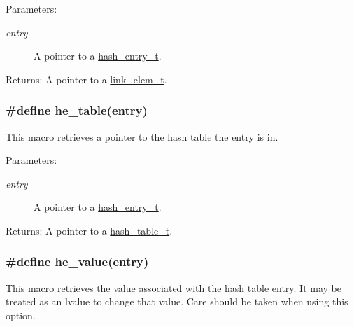 \begin{Desc}
\item[Parameters:]
\begin{description}
\item[{\em entry}]A pointer to a \hyperlink{group__dbprim__hash_a1}{hash\_\-entry\_\-t}.\end{description}
\end{Desc}
\begin{Desc}
\item[Returns:]A pointer to a \hyperlink{group__dbprim__link_a1}{link\_\-elem\_\-t}. \end{Desc}
\hypertarget{group__dbprim__hash_a33}{
\subsubsection[he\_\-table]{\setlength{\rightskip}{0pt plus 5cm}\#define he\_\-table(entry)}}
\label{group__dbprim__hash_a33}


This macro retrieves a pointer to the hash table the entry is in.

\begin{Desc}
\item[Parameters:]
\begin{description}
\item[{\em entry}]A pointer to a \hyperlink{group__dbprim__hash_a1}{hash\_\-entry\_\-t}.\end{description}
\end{Desc}
\begin{Desc}
\item[Returns:]A pointer to a \hyperlink{group__dbprim__hash_a0}{hash\_\-table\_\-t}. \end{Desc}
\hypertarget{group__dbprim__hash_a36}{
\subsubsection[he\_\-value]{\setlength{\rightskip}{0pt plus 5cm}\#define he\_\-value(entry)}}
\label{group__dbprim__hash_a36}


This macro retrieves the value associated with the hash table entry. It may be treated as an lvalue to change that value. Care should be taken when using this option.

